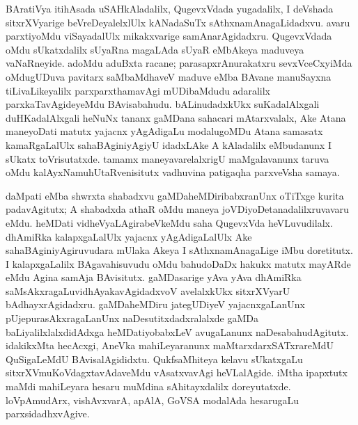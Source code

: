 BAratiVya itihAsada uSAHkAladalilx, QugevxVdada yugadalilx, I deVshada sitxrXVyarige beVreDeyalelxlUlx kANadaSuTx sAthxnamAnagaLidadxvu. avaru parxtiyoMdu viSayadalUlx mikakxvarige samAnarAgidadxru. QugevxVdada oMdu sUkatxdalilx sUyaRna magaLAda sUyaR eMbAkeya maduveya vaNaRneyide. adoMdu aduBxta racane; parasapxrAnurakatxru sevxVceCxyiMda oMdugUDuva pavitarx saMbaMdhaveV maduve eMba BAvane manuSayxna tiLivaLikeyalilx parxparxthamavAgi mUDibaMdudu adaralilx parxkaTavAgideyeMdu BAvisabahudu. bALinudadxkUkx suKadalAlxgali duHKadalAlxgali heNuNx tananx gaMDana sahacari mAtarxvalalx, Ake Atana maneyoDati matutx yajacnx yAgAdigaLu modalugoMDu Atana samasatx kamaRgaLalUlx sahaBAginiyAgiyU idadxLAke A kAladalilx eMbudanunx I sUkatx toVrisutatxde. tamamx maneyavarelalxrigU maMgalavanunx taruva oMdu kalAyxNamuhUtaRvenisitutx vadhuvina patigaqha parxveVsha samaya.

daMpati eMba shwrxta shabadxvu gaMDaheMDiribabxranUnx oTiTxge kurita padavAgitutx; A shabadxda athaR oMdu maneya joVDiyoDetanadalilxruvavaru eMdu. heMDati vidheVya\-LAgirabeVkeMdu saha QugevxVda heVLuvudilalx. dhAmiRka kalapxgaLalUlx yajacnx yAgAdi\-gaLalUlx Ake sahaBAginiyAgiruvudara mUlaka Akeya I sAthxnamAnagaLige iMbu doretitutx. I kalapxgaLalilx BAgavahisuvudu oMdu bahudoDaDx hakukx matutx mayARde eMdu Agina samAja BAvisitutx. gaMDasarige yAva yAva dhAmiRka saMsAkxragaLu\break vidhAyakavAgidadxvoV avelalxkUkx sitxrXVyarU bAdhayxrAgidadxru. gaMDaheMDiru jate\break\-gUDiyeV yajacnxgaLanUnx pUjepurasAkxragaLanUnx naDesutitxdadxralalxde gaMDa baLiyalilxlalx\-didAdxga heMDatiyobabxLeV avugaLanunx naDesabahudAgitutx. idakikxMta hecAcxgi, AneVka mahiLeyaranunx maMtarxdarxSATxrareMdU QuSigaLeMdU BAvisalAgididxtu. QukfsaMhiteya kelavu sUkatxgaLu sitxrXVmuKoVdagxtavAdaveMdu vAsatxvavAgi heVLalAgide. iMtha \hbox{ipapxtutx} maMdi mahiLeyara hesaru muMdina sAhitayxdalilx doreyutatxde. loVpAmudArx, vishAvxvarA, apAlA, GoVSA modalAda hesarugaLu parxsidadhxvAgive.

